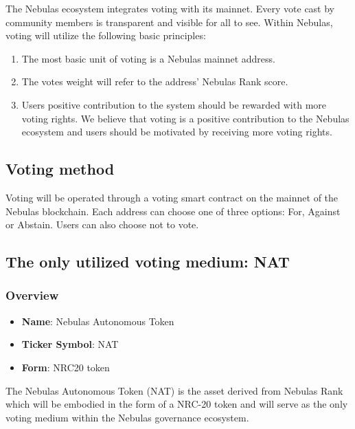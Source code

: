 The Nebulas ecosystem integrates voting with its mainnet. Every vote cast by community members is transparent and visible for all to see. Within Nebulas, voting will utilize the following basic principles:

\begin{enumerate}
	\item The most basic unit of voting is a Nebulas mainnet address.
	\item The votes weight will refer to the address' Nebulas Rank score.
	\item Users positive contribution to the system should be rewarded with more voting rights. We believe that voting is a positive contribution to the Nebulas ecosystem and users should be motivated by receiving more voting rights.
\end{enumerate}

\subsection{Voting method}

Voting will be operated through a voting smart contract on the mainnet of the Nebulas blockchain. Each address can choose one of three options: For, Against or Abstain. Users can also choose not to vote.

\subsection{The only utilized voting medium: NAT}

\label{nat}

\subsubsection{Overview}

\begin{itemize}
	\item \textbf{Name}: Nebulas Autonomous Token
	\item \textbf{Ticker Symbol}: NAT
	\item \textbf{Form}: NRC20 token
\end{itemize}

The Nebulas Autonomous Token (NAT) is the asset derived from Nebulas Rank which will be embodied in the form of a NRC-20 token and will serve as the only voting medium within the Nebulas governance ecosystem.

